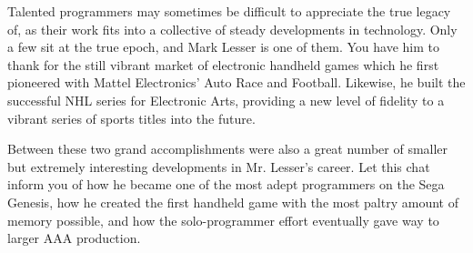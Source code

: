 Talented programmers may sometimes be difficult to appreciate the true legacy of, as their work fits into a collective of steady developments in technology. Only a few sit at the true epoch, and Mark Lesser is one of them. You have him to thank for the still vibrant market of electronic handheld games which he first pioneered with Mattel Electronics’ Auto Race and Football. Likewise, he built the successful NHL series for Electronic Arts, providing a new level of fidelity to a vibrant series of sports titles into the future.

Between these two grand accomplishments were also a great number of smaller but extremely interesting developments in Mr. Lesser’s career. Let this chat inform you of how he became one of the most adept programmers on the Sega Genesis, how he created the first handheld game with the most paltry amount of memory possible, and how the solo-programmer effort eventually gave way to larger AAA production.

\noindent\makebox[\linewidth]{\rule{\paperwidth}{0.4pt}}